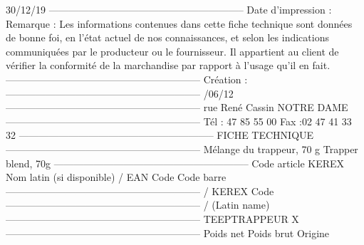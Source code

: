 30/12/19 \newline ----------------------------------------------------------- \newline Date d'impression :  \newline Remarque :  \newline Les informations contenues dans cette fiche technique sont données de bonne foi, en l’état actuel de nos connaissances, et selon  \newline les indications communiquées par le producteur ou le fournisseur. Il appartient au client de vérifier la conformité de la marchandise  \newline par rapport à l’usage qu’il en fait. \newline ----------------------------------------------------------- \newline Création :  \newline ----------------------------------------------------------- /06/12 \newline -----------------------------------------------------------  rue René Cassin  NOTRE DAME \newline ----------------------------------------------------------- \newline Tél :  47 85 55 00 \newline Fax :02 47 41 33 32 \newline ----------------------------------------------------------- \newline FICHE TECHNIQUE \newline ----------------------------------------------------------- \newline Mélange du trappeur, 70 g \newline Trapper blend, 70g \newline ----------------------------------------------------------- \newline Code article KEREX \newline Nom latin (si disponible) \newline / EAN Code \newline Code barre  \newline ----------------------------------------------------------- \newline / KEREX Code \newline ----------------------------------------------------------- \newline / (Latin name) \newline ----------------------------------------------------------- \newline TEEPTRAPPEUR \newline X  \newline ----------------------------------------------------------- \newline Poids net \newline Poids brut \newline Origine  